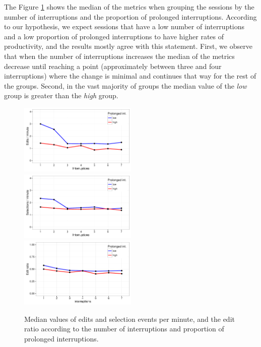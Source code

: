 The Figure \ref{fig:udc_rq2} shows the median of the metrics when grouping the sessions by the number of interruptions and the proportion of prolonged interruptions. According to our hypothesis, we expect sessions that have a low number of interruptions and a low proportion of prolonged interruptions to have higher rates of productivity, and the results mostly agree with this statement. First, we observe that when the number of interruptions increases the median of the metrics decrease until reaching a point (approximately between three and four interruptions) where the change is minimal and continues that way for the rest of the groups. Second, in the vast majority of groups the median value of the \emph{low} group is greater than the \emph{high} group.

\begin{figure}[!ht]
	\caption{Median values of edits and selection events per minute, and the edit ratio according to the number
		of interruptions and proportion of prolonged interruptions.}
	\centering		
	\includegraphics[width=0.5\textwidth]{Figures/UDC_rq2_emin}
	\includegraphics[width=0.5\textwidth]{Figures/UDC_rq2_smin}
	\includegraphics[width=0.5\textwidth]{Figures/UDC_rq2_eratio}
	\label{fig:udc_rq2}
\end{figure}


